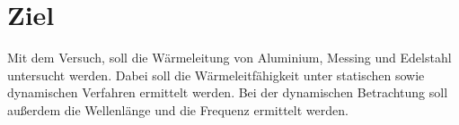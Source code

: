 \section{Ziel}
\label{sec:ziel}
Mit dem Versuch, soll die Wärmeleitung von Aluminium, Messing und Edelstahl untersucht werden.
Dabei soll die Wärmeleitfähigkeit unter statischen sowie dynamischen Verfahren ermittelt werden. Bei der dynamischen Betrachtung soll außerdem
die Wellenlänge und die Frequenz ermittelt werden.